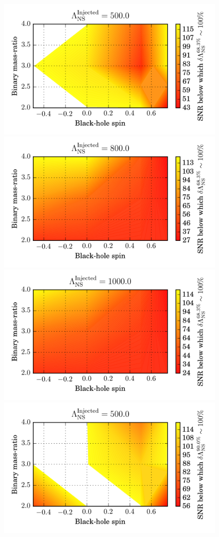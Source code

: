 \documentclass[aps,prd,amsmath,floats,floatfix, twocolumn,
superscriptaddress,nofootinbib,showpacs]{revtex4-1}
\begin{document}
\begin{figure}
\centering    
\includegraphics[width=.65\columnwidth]{plots-TT/TT_SNRThresholdForLambdaMeasurement_BHspin_MassRatio_Lambda500_0_CI68_3.png}
\includegraphics[width=.65\columnwidth]{plots-TT/TT_SNRThresholdForLambdaMeasurement_BHspin_MassRatio_Lambda800_0_CI68_3.png}
\includegraphics[width=.65\columnwidth]{plots-TT/TT_SNRThresholdForLambdaMeasurement_BHspin_MassRatio_Lambda1000_0_CI68_3.png}\\
\includegraphics[width=.65\columnwidth]{plots-TT/TT_SNRThresholdForLambdaMeasurement_BHspin_MassRatio_Lambda500_0_CI90_0.png}

\end{figure}
\end{document}

